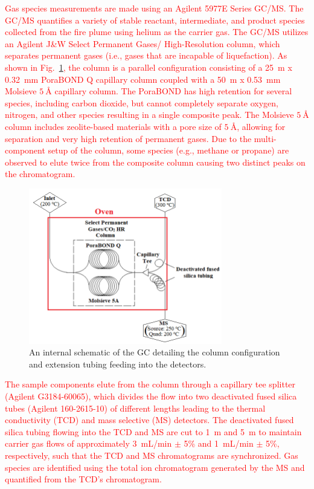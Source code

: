 \documentclass[12pt]{article}
\begin{document}
\textcolor{red}{Gas species measurements are made using an Agilent 5977E Series GC/MS. The GC/MS quantifies a variety of stable reactant, intermediate, and product species collected from the fire plume using helium as the carrier gas. The GC/MS utilizes an Agilent J\&W Select Permanent Gases/ High-Resolution column, which separates permanent gases (i.e., gases that are incapable of liquefaction). As shown in Fig.~\ref{fig:GC_Intern}, the column is a parallel configuration consisting of a 25~m x 0.32~mm PoraBOND Q capillary column coupled with a 50~m x 0.53~mm Molsieve $\SI{5}{\angstrom}$ capillary column. The PoraBOND has high retention for several species, including carbon dioxide, but cannot completely separate oxygen, nitrogen, and other species resulting in a single composite peak. The Molsieve $\SI{5}{\angstrom}$ column includes zeolite-based materials with a pore size of $\SI{5}{\angstrom}$, allowing for separation and very high retention of permanent gases. Due to the multi-component setup of the column, some species (e.g., methane or propane) are observed to elute twice from the composite column causing two distinct peaks on the chromatogram.}

\begin{figure}[h!]
	\centering
\includegraphics[width=8.45cm,keepaspectratio]{GC_Internal.png}
	\caption[A schematic of the internal plumbing system in the gas chromatograph]{An internal schematic of the GC detailing the column configuration and extension tubing feeding into the detectors.}
	\label{fig:GC_Intern}
\end{figure}

\textcolor{red}{The sample components elute from the column through a capillary tee splitter (Agilent G3184-60065), which divides the flow into two deactivated fused silica tubes (Agilent 160-2615-10) of different lengths leading to the thermal conductivity (TCD) and mass selective (MS) detectors. The deactivated fused silica tubing flowing into the TCD and MS are cut to 1~m and 5~m to maintain carrier gas flows of approximately 3~mL/min $\pm$ 5\% and 1~mL/min $\pm$ 5\%, respectively, such that the TCD and MS chromatograms are synchronized. Gas species are identified using the total ion chromatogram generated by the MS and quantified from the TCD's chromatogram.}
\end{document}
